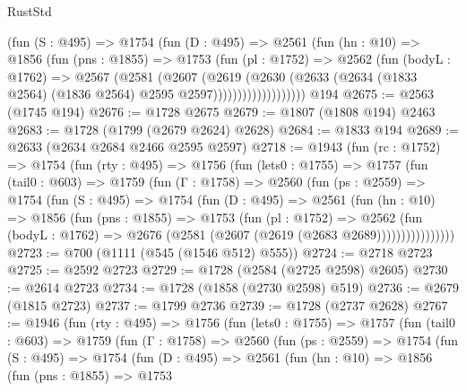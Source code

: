 \begin{lexlean}{RustStd}
\begin{coremodule}
{\begin{coremodule}
{{{{{{{{{{{{{                  (fun (S : @495) =>
                  @1754
                    (fun (D : @495) =>
                    @2561
                      (fun (hn : @10) =>
                      @1856
                        (fun (pns : @1855) =>
                        @1753
                          (fun (pl : @1752) =>
                          @2562
                            (fun (bodyL : @1762) =>
                            @2567
                              (@2581
                                (@2607
                                  (@2619
                                    (@2630
                                      (@2633
                                        (@2634
                                          (@1833 @2564)
                                          (@1836 @2564)
                                          @2595
                                          @2597)))))))))))))))))))
    @194
@2675 := @2563 (@1745 @194)
@2676 := @1728 @2675
@2679 := @1807 (@1808 @194) @2463
@2683 := @1728 (@1799 (@2679 @2624) @2628)
@2684 := @1833 @194
@2689 := @2633 (@2634 @2684 @2466 @2595 @2597)
@2718 := @1943
    (fun (rc : @1752) =>
    @1754
      (fun (rty : @495) =>
      @1756
        (fun (lets0 : @1755) =>
        @1757
          (fun (tail0 : @603) =>
          @1759
            (fun (Γ : @1758) =>
            @2560
              (fun (ps : @2559) =>
              @1754
                (fun (S : @495) =>
                @1754
                  (fun (D : @495) =>
                  @2561
                    (fun (hn : @10) =>
                    @1856
                      (fun (pns : @1855) =>
                      @1753
                        (fun (pl : @1752) =>
                        @2562
                          (fun (bodyL : @1762) =>
                          @2676 (@2581 (@2607 (@2619 (@2683 @2689))))))))))))))))
@2723 := @700 (@1111 (@545 (@1546 @512) @555))
@2724 := @2718 @2723
@2725 := @2592 @2723
@2729 := @1728 (@2584 (@2725 @2598) @2605)
@2730 := @2614 @2723
@2734 := @1728 (@1858 (@2730 @2598) @519)
@2736 := @2679 (@1815 @2723)
@2737 := @1799 @2736
@2739 := @1728 (@2737 @2628)
@2767 := @1946
    (fun (rty : @495) =>
    @1756
      (fun (lets0 : @1755) =>
      @1757
        (fun (tail0 : @603) =>
        @1759
          (fun (Γ : @1758) =>
          @2560
            (fun (ps : @2559) =>
            @1754
              (fun (S : @495) =>
              @1754
                (fun (D : @495) =>
                @2561
                  (fun (hn : @10) =>
                  @1856
                    (fun (pns : @1855) =>
                    @1753
}}}}}}}}}}}}}
\end{coremodule}}
\end{coremodule}
\end{lexlean}
